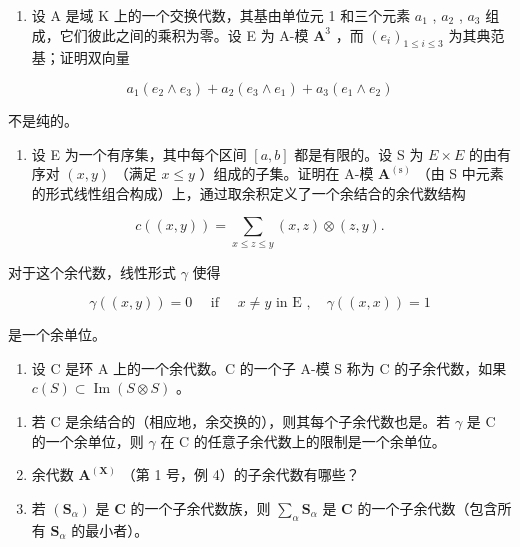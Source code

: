 \begin{enumerate}
\def\labelenumi{(\alph{enumi})}
\setcounter{enumi}{1}
\tightlist
\item
  设 A 是域 K 上的一个交换代数，其基由单位元 1 和三个元素 \(a_{1}\) , \(a_{2}\) , \(a_{3}\) 组成，它们彼此之间的乘积为零。设 E 为 A-模 \(\mathbf{A}^3\) ，而 \((e_i)_{1\leqslant i\leqslant 3}\) 为其典范基；证明双向量
\end{enumerate}

\[
a _ {1} (e _ {2} \land e _ {3}) + a _ {2} (e _ {3} \land e _ {1}) + a _ {3} (e _ {1} \land e _ {2})
\]

不是纯的。

\begin{enumerate}
\def\labelenumi{\arabic{enumi}.}
\setcounter{enumi}{21}
\tightlist
\item
  设 E 为一个有序集，其中每个区间 \([a, b]\) 都是有限的。设 S 为 \(E \times E\) 的由有序对 \((x, y)\) （满足 \(x \leqslant y\) ）组成的子集。证明在 A-模 \(\mathbf{A}^{(\mathrm{s})}\) （由 S 中元素的形式线性组合构成）上，通过取余积定义了一个余结合的余代数结构
\end{enumerate}

\[
c ((x, y)) = \sum_ {x \leqslant z \leqslant y} (x, z) \otimes (z, y).
\]

对于这个余代数，线性形式 \(\gamma\) 使得

\[
\gamma ((x, y)) = 0 \quad \text { if } \quad x \neq y \text { in   E }, \quad \gamma ((x, x)) = 1
\]

是一个余单位。

\begin{enumerate}
\def\labelenumi{\arabic{enumi}.}
\setcounter{enumi}{22}
\tightlist
\item
  设 C 是环 A 上的一个余代数。C 的一个子 A-模 S 称为 C 的子余代数，如果 \(c(S) \subset \operatorname{Im}(S \otimes S)\) 。
\end{enumerate}

\begin{enumerate}
\def\labelenumi{(\alph{enumi})}
\item
  若 C 是余结合的（相应地，余交换的），则其每个子余代数也是。若 \(\gamma\) 是 C 的一个余单位，则 \(\gamma\) 在 C 的任意子余代数上的限制是一个余单位。
\item
  余代数 \(\mathbf{A}^{(\mathbf{X})}\) （第 1 号，例 4）的子余代数有哪些？
\item
  若 \((\mathbf{S}_{\alpha})\) 是 \(\mathbf{C}\) 的一个子余代数族，则 \(\sum_{\alpha} \mathbf{S}_{\alpha}\) 是 \(\mathbf{C}\) 的一个子余代数（包含所有 \(\mathbf{S}_{\alpha}\) 的最小者）。
\end{enumerate}

